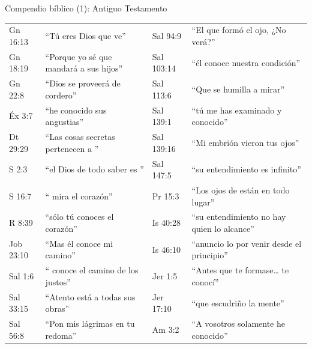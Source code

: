 \begin{frame}{Compendio bíblico (1): Antiguo Testamento}
\fontsize{6.2}{7.4}\selectfont\renewcommand{\arraystretch}{1.06}
\begin{tabular}{@{}>{\RaggedRight\arraybackslash}p{1.6cm}>{\RaggedRight\arraybackslash}p{4.3cm}|>{\RaggedRight\arraybackslash}p{1.6cm}>{\RaggedRight\arraybackslash}p{4.3cm}@{}}
\toprule
Gn 16:13 & ``Tú eres Dios que ve'' & Sal 94:9 & ``El que formó el ojo, ¿No verá?'' \\
Gn 18:19 & ``Porque yo sé que mandará a sus hijos'' & Sal 103:14 & ``él conoce nuestra condición'' \\
Gn 22:8 & ``Dios se proveerá de cordero'' & Sal 113:6 & ``Que se humilla a mirar'' \\
Éx 3:7 & ``he conocido sus angustias'' & Sal 139:1 & ``tú me has examinado y conocido'' \\
Dt 29:29 & ``Las cosas secretas pertenecen a \SENOR{}'' & Sal 139:16 & ``Mi embrión vieron tus ojos'' \\
1 S 2:3 & ``el Dios de todo saber es \SENOR{}'' & Sal 147:5 & ``su entendimiento es infinito'' \\
1 S 16:7 & ``\SENOR{} mira el corazón'' & Pr 15:3 & ``Los ojos de \SENOR{} están en todo lugar'' \\
1 R 8:39 & ``sólo tú conoces el corazón'' & Is 40:28 & ``su entendimiento no hay quien lo alcance'' \\
Job 23:10 & ``Mas él conoce mi camino'' & Is 46:10 & ``anuncio lo por venir desde el principio'' \\
Sal 1:6 & ``\SENOR{} conoce el camino de los justos'' & Jer 1:5 & ``Antes que te formase\ldots{} te conocí'' \\
Sal 33:15 & ``Atento está a todas sus obras'' & Jer 17:10 & ``que escudriño la mente'' \\
Sal 56:8 & ``Pon mis lágrimas en tu redoma'' & Am 3:2 & ``A vosotros solamente he conocido'' \\
\bottomrule
\end{tabular}
\end{frame}

